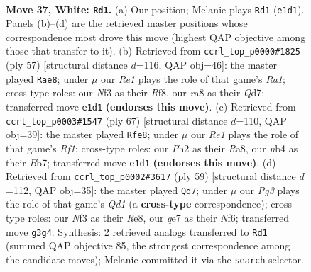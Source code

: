 \documentclass[11pt]{article}
\begin{document}
\clearpage

\begin{figure}[p]\centering
\begin{subfigure}{0.46\textwidth}\centering
\resizebox{\linewidth}{!}{%
\newchessgame
\chessboard[
  setfen={rnb4r/1p2q1k1/4p3/p1p2p1p/PnNP1P2/5NP1/1P1QB1KP/4R2R w - - 1 37},
  showmover=false,
  pgfstyle=straightmove, color=movearrow, markmove={e1-d1}
]}
\caption{}
\end{subfigure}\hfill
\begin{subfigure}{0.46\textwidth}\centering
\resizebox{\linewidth}{!}{%
\newchessgame
\chessboard[
  setfen={r4r2/3q2kp/2n1ppp1/p1Pp3P/1n1P1P2/4R1N1/1P1Q2PN/3R2K1 b - - 1 29},
  showmover=false,
  pgfstyle=straightmove, color=movearrow, markmove={a8-e8}
]}
\caption{}
\end{subfigure}
\\[4pt]
\begin{subfigure}{0.46\textwidth}\centering
\resizebox{\linewidth}{!}{%
\newchessgame
\chessboard[
  setfen={r4rk1/1b2qppp/p2n4/1pNPp3/1P2P3/P2BR2P/6P1/R3Q1K1 b - - 18 34},
  showmover=false,
  pgfstyle=straightmove, color=movearrow, markmove={f8-e8}
]}
\caption{}
\end{subfigure}\hfill
\begin{subfigure}{0.46\textwidth}\centering
\resizebox{\linewidth}{!}{%
\newchessgame
\chessboard[
  setfen={2rqr3/1p4bk/3p1np1/1NnP1p1p/2P1pP2/1P2B1P1/2BQR2P/5R1K b - - 2 30},
  showmover=false,
  pgfstyle=straightmove, color=movearrow, markmove={d8-d7}
]}
\caption{}
\end{subfigure}
\caption{\textbf{Move 37, White: \texttt{Rd1}.} (a) Our position; Melanie plays \texttt{Rd1} (\texttt{e1d1}). Panels (b)--(d) are the retrieved master positions whose correspondence most drove this move (highest QAP objective among those that transfer to it). (b) Retrieved from \texttt{ccrl\_top\_p0000\#1825} (ply 57) [structural distance $d$=116, QAP obj=46]: the master played \texttt{Rae8}; under $\mu$ our \emph{Re1} plays the role of that game's \emph{Ra1}; cross-type roles: our \emph{N}f3 as their \emph{R}f8, our \emph{r}a8 as their \emph{Q}d7; transferred move \texttt{e1d1} \textbf{(endorses this move)}. (c) Retrieved from \texttt{ccrl\_top\_p0003\#1547} (ply 67) [structural distance $d$=110, QAP obj=39]: the master played \texttt{Rfe8}; under $\mu$ our \emph{Re1} plays the role of that game's \emph{Rf1}; cross-type roles: our \emph{P}h2 as their \emph{R}a8, our \emph{n}b4 as their \emph{B}b7; transferred move \texttt{e1d1} \textbf{(endorses this move)}. (d) Retrieved from \texttt{ccrl\_top\_p0002\#3617} (ply 59) [structural distance $d$=112, QAP obj=35]: the master played \texttt{Qd7}; under $\mu$ our \emph{Pg3} plays the role of that game's \emph{Qd1} (a \textbf{cross-type} correspondence); cross-type roles: our \emph{N}f3 as their \emph{R}e8, our \emph{q}e7 as their \emph{N}f6; transferred move \texttt{g3g4}. Synthesis: 2 retrieved analogs transferred to \texttt{Rd1} (summed QAP objective 85, the strongest correspondence among the candidate moves); Melanie committed it via the \texttt{search} selector.}
\label{fig:thought-m72}
\end{figure}
\end{document}
